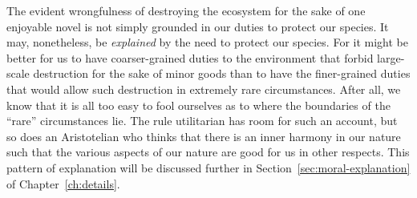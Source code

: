 The evident wrongfulness of destroying the ecosystem for the sake of one enjoyable novel is not simply grounded in our duties to 
protect our species. It may, nonetheless, be \textit{explained} by the need to protect our species. For it might be better for 
us to have coarser-grained duties to the environment that forbid large-scale destruction for the sake of minor goods than to 
have the finer-grained duties that would allow such destruction in extremely rare circumstances. After all, we know that it is 
all too easy to fool ourselves as to where the boundaries of the ``rare'' circumstances lie. The rule utilitarian has room for 
such an account, but so does an Aristotelian who thinks that there is an inner harmony in our nature such that the various 
aspects of our nature are good for us in other respects. This pattern of explanation will be discussed further in Section~\ref{sec:moral-explanation}
of Chapter~\ref{ch:details}.

\chaptertail

